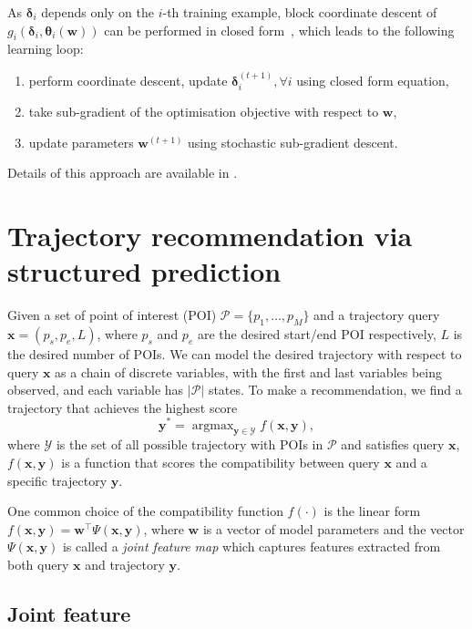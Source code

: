 \documentclass[9pt]{extarticle}
\DeclareMathOperator*{\argmax}{argmax}
\begin{document}
As $\bm{\delta}_i$ depends only on the $i$-th training example, block coordinate descent of $g_i(\bm{\delta}_i, \bm{\theta}_i(\mathbf{w}))$ 
can be performed in closed form~\cite{werner2007linear, globerson2008fixing}, 
which leads to the following learning loop:
\begin{enumerate}
\item perform coordinate descent, update $\bm{\delta}_i^{(t+1)}, \forall i$ using closed form equation,
\item take sub-gradient of the optimisation objective with respect to $\mathbf{w}$,
\item update parameters $\mathbf{w}^{(t+1)}$ using stochastic sub-gradient descent.
\end{enumerate}
Details of this approach are available in \cite{meshi2010learning}.


\section{Trajectory recommendation via structured prediction}
\label{sec:recommend}

Given a set of point of interest (POI) $\mathcal{P} = \{p_1, \dots, p_M\}$ and a trajectory query $\mathbf{x} = (p_s, p_e, L)$,
where $p_s$ and $p_e$ are the desired start/end POI respectively, $L$ is the desired number of POIs.
We can model the desired trajectory with respect to query $\mathbf{x}$ as a chain of discrete variables, 
with the first and last variables being observed, and each variable has $|\mathcal{P}|$ states.
To make a recommendation, we find a trajectory that achieves the highest score
\begin{equation*}
\mathbf{y}^* = \argmax_{\mathbf{y} \in \mathcal{Y}} f(\mathbf{x}, \mathbf{y}),
\end{equation*}
where $\mathcal{Y}$ is the set of all possible trajectory with POIs in $\mathcal{P}$ and satisfies query $\mathbf{x}$,
$f(\mathbf{x}, \mathbf{y})$ is a function that scores the compatibility between query $\mathbf{x}$ and a specific trajectory $\mathbf{y}$.

One common choice of the compatibility function $f(\cdot)$ is the linear form
$f(\mathbf{x}, \mathbf{y}) = \mathbf{w}^\top \Psi(\mathbf{x}, \mathbf{y})$,
where $\mathbf{w}$ is a vector of model parameters and 
the vector $\Psi(\mathbf{x}, \mathbf{y})$ is called a \emph{joint feature map} 
which captures features extracted from both query $\mathbf{x}$ and trajectory $\mathbf{y}$.


\subsection{Joint feature}
\label{sec:jointfeature}
\end{document}
